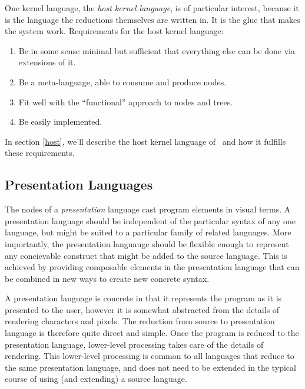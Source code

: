 
One kernel language, the \emph{host kernel language}, is of particular interest, because it is the language the reductions themselves are written in. It is the glue that makes the system work. Requirements for the host kernel language:
\begin{enumerate}
\item Be in some sense minimal but sufficient that everything else can be done via extensions of it.
\item Be a meta-language, able to consume and produce nodes.
\item Fit well with the ``functional'' approach to nodes and trees.
\item Be easily implemented.
\end{enumerate}

In section \ref{host}, we'll describe the host kernel language of \Meta\ and how it fulfills these requirements.


\subsection{Presentation Languages}
The nodes of a \emph{presentation} language cast program elements in visual terms. A presentation language should be independent of the particular syntax of any one language, but might be suited to a particular family of related languages. More importantly, the presentation languauge should be flexible enough to represent any concievable construct that might be added to the source language. This is achieved by providing composable elements in the presentation language that can be combined in new ways to create new concrete syntax.

A presentation language is concrete in that it represents the program as it is presented to the user, however it is somewhat abstracted from the details of rendering characters and pixels. The reduction from source to presentation language is therefore quite direct and simple. Once the program is reduced to the presentation language, lower-level processing takes care of the details of rendering. This lower-level processing is common to all languages that reduce to the same presentation language, and does not need to be extended in the typical course of using (and extending) a source language.

